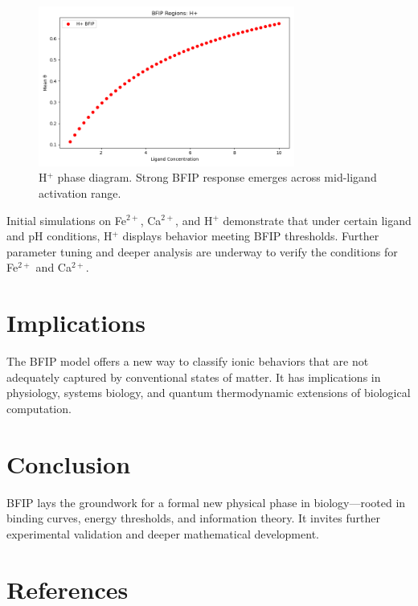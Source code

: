 \documentclass[11pt]{article}
\begin{document}
\begin{figure}[h]
    \centering
    \includegraphics[width=0.75\textwidth]{figures/bio_phase_diagram_H+.png}
    \caption{H$^+$ phase diagram. Strong BFIP response emerges across mid-ligand activation range.}
    \label{fig:hplus_phase}
\end{figure}


Initial simulations on Fe$^{2+}$, Ca$^{2+}$, and H$^+$ demonstrate that under certain ligand and pH conditions, H$^+$ displays behavior meeting BFIP thresholds. Further parameter tuning and deeper analysis are underway to verify the conditions for Fe$^{2+}$ and Ca$^{2+}$.

\section{Implications}

The BFIP model offers a new way to classify ionic behaviors that are not adequately captured by conventional states of matter. It has implications in physiology, systems biology, and quantum thermodynamic extensions of biological computation.

\section{Conclusion}

BFIP lays the groundwork for a formal new physical phase in biology—rooted in binding curves, energy thresholds, and information theory. It invites further experimental validation and deeper mathematical development.

\section*{References}



\end{document}
